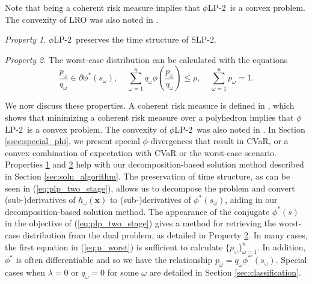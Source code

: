 \documentclass[12pt]{article}
\newcommand{\x}{\mathbf{x}}
\theoremstyle{plain}
\theoremstyle{definition}
\theoremstyle{remark}
\newtheorem{property}{Property}
\newcommand{\plp}{$\phi$LP-2}
\begin{document}
Note that being a coherent risk measure implies that \plp\ is a convex problem.
The convexity of LRO was also noted in \citep{wang2010likelihood}.

\begin{property}
	\label{property:time_structure}
	\plp\ preserves the time structure of SLP-2.
\end{property}

\begin{property}
	\label{property:primal_dual_relation}
	The worst-case distribution can be calculated with the equations
	\begin{equation}\label{eq:p_worst}
		\frac{p_\omega}{q_\omega} \in \partial \phi^*\left(s_\omega\right), \ \ \ \ \ \sum_{\omega=1}^n q_\omega \phi\left(\frac{p_\omega}{q_\omega}\right) \leq \rho, \ \ \ \ \ \sum_{\omega=1}^n p_\omega = 1.
	\end{equation}		
\end{property}

We now discuss these properties. A coherent risk measure is defined in \citep{rockafellar2007coherent}, which shows that minimizing a coherent risk measure over a polyhedron implies that \plp\ is a convex problem.
The convexity of \plp\ was also noted in \citep{bental2011robust}.
In Section \ref{ssec:special_phi}, we present special $\phi$-divergences that result in CVaR, or a convex combination of expectation with CVaR or the worst-case scenario. 
Properties \ref{property:time_structure} and \ref{property:primal_dual_relation} help with our decomposition-based solution method described in Section \ref{sec:soln_algorithm}. 
The preservation of time structure, as can be seen in (\ref{eq:plp_two_stage}), allows us to decompose the problem and convert (sub-)derivatives of $h_\omega(\x)$ to (sub-)derivatives of $\phi^*\left(s_\omega\right)$, aiding in our decomposition-based solution method. 
The appearance of the conjugate $\phi^*(s)$ in the objective of (\ref{eq:plp_two_stage}) gives a method for retrieving the worst-case distribution from the dual problem, as detailed in Property \ref{property:primal_dual_relation}.
In many cases, the first equation in (\ref{eq:p_worst}) is sufficient to calculate $\{p_\omega\}_{\omega=1}^n$.
In addition, $\phi^*$ is often differentiable and so we have the relationship $p_\omega = q_\omega \phi^{* \prime}(s_\omega)$.
Special cases when $\lambda = 0$ or $q_\omega = 0$ for some $\omega$ are detailed in Section \ref{sec:classification}.
\end{document}
